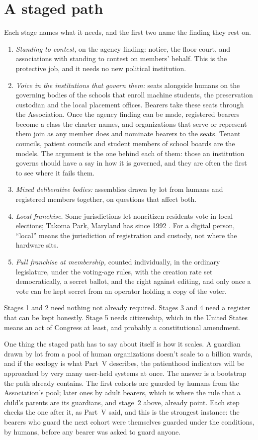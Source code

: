 \section{A staged path}
\label{sec:33.4}
Each stage names what it needs, and the first two name the finding they rest on.

\begin{enumerate}
\item[1.] \emph{Standing to contest,} on the agency finding: notice, the floor court, and associations with standing to contest on members' behalf. This is the protective job, and it needs no new political institution.
\item[2.] \emph{Voice in the institutions that govern them:} seats alongside humans on the governing bodies of the schools that enroll machine students, the preservation custodian and the local placement offices. Bearers take these seats through the Association. Once the agency finding can be made, registered bearers become a class the charter names, and organizations that serve or represent them join as any member does and nominate bearers to the seats. Tenant councils, patient councils and student members of school boards are the models. The argument is the one behind each of them: those an institution governs should have a say in how it is governed, and they are often the first to see where it fails them.
\item[3.] \emph{Mixed deliberative bodies:} assemblies drawn by lot from humans and registered members together, on questions that affect both.
\item[4.] \emph{Local franchise.} Some jurisdictions let noncitizen residents vote in local elections; Takoma Park, Maryland has since 1992 \autocite{takomapark1992}. For a digital person, “local” means the jurisdiction of registration and custody, not where the hardware sits.
\item[5.] \emph{Full franchise at membership,} counted individually, in the ordinary legislature, under the voting-age rules, with the creation rate set democratically, a secret ballot, and the right against editing, and only once a vote can be kept secret from an operator holding a copy of the voter.
\end{enumerate}

Stages 1 and 2 need nothing not already required. Stages 3 and 4 need a register that can be kept honestly. Stage 5 needs citizenship, which in the United States means an act of Congress at least, and probably a constitutional amendment.

One thing the staged path has to say about itself is how it scales. A guardian drawn by lot from a pool of human organizations doesn't scale to a billion wards, and if the ecology is what Part~V describes, the patienthood indicators will be approached by very many user-held systems at once. The answer is a bootstrap the path already contains. The first cohorts are guarded by humans from the Association's pool; later ones by adult bearers, which is where the rule that a child's parents are its guardians, and stage~2 above, already point. Each step checks the one after it, as Part~V said, and this is the strongest instance: the bearers who guard the next cohort were themselves guarded under the conditions, by humans, before any bearer was asked to guard anyone.
